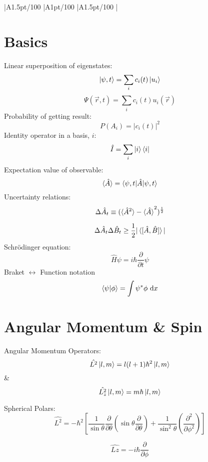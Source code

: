 \documentclass[table,cmyk]{article}
\makeatletter
\newcommand\ratio[2]{\strip@pt\dimexpr#1pt/#2\relax}
\makeatother
\begin{document}
\begin{longtable}
{
    |A{1.5}{\ratio{30}{100}}%
    |A{1}{\ratio{30}{100}}%
    |A{1.5}{\ratio{30}{100}}%
    |%
}\hline
\section*{Basics}
Linear superposition of eigenstates:
\[
\ket{\psi,t} = \sum_{i} c_i(t)\ket{u_i}
\]
\[
\Psi(\vec{r},t) = \sum_{i} c_i(t)u_i(\vec{r})
\]
Probability of getting result:
\[
P(A_i) = |c_i(t)|^2\]
Identity operator in a basis, $i$:
  \[
  \hat I=\sum_{i}\ket{i}\bra{i}
  \]  
Expectation value of observable:
\[\braket{\hat{A}} = \braket{\psi, t|\hat{A}|\psi, t}\]
Uncertainty relations:
\[\Delta\hat{A}_t \equiv (\braket{\hat{A}^2} - \braket{\hat{A}}^2)^{\frac{1}{2}}\]

\[\Delta\hat{A}_t\Delta\hat{B}_t \ge \frac{1}{2} |\braket{[ \hat{A},\hat{B} ]}|\]
Schr\"odinger equation:
  \[
  \hat H\psi = i \hbar \frac{\partial}{\partial t} \psi
  \]
Braket $\leftrightarrow$ Function notation
  \[
  \braket{\psi|\phi}=\int \psi^*\phi\  \mathrm{d}x
  \]




\section*{Angular Momentum \& Spin}
Angular Momentum Operators:
\[
\hat{L^2}\ket{l,m} = l(l+1)\hbar^2\ket{l,m}
\]
&
\[\hat{L^2_z} \ket{l,m} = m\hbar\ket{l,m}\]

Spherical Polars:
\[ \hat{L^2} = -\hbar^2\left[\frac{1}{\sin{\theta}} \frac{\partial}{\partial\theta}\left(\sin{\theta}\frac{\partial}{\partial\theta}\right)+\frac{1}{\sin^2{\theta}} \left( \frac{\partial^2}{\partial\phi^2}\right) \right] \]

\[ \hat{Lz} = -i\hbar\frac{\partial}{\partial\phi}\]

\end{longtable}
\end{document}

